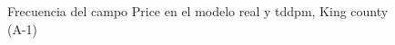 \begin{figure}[H]
    \centering
    
    \caption{Frecuencia del campo Price en el modelo real y tddpm, King county (A-1)}
    \label{frecuency-tddpm-price}
\end{figure}